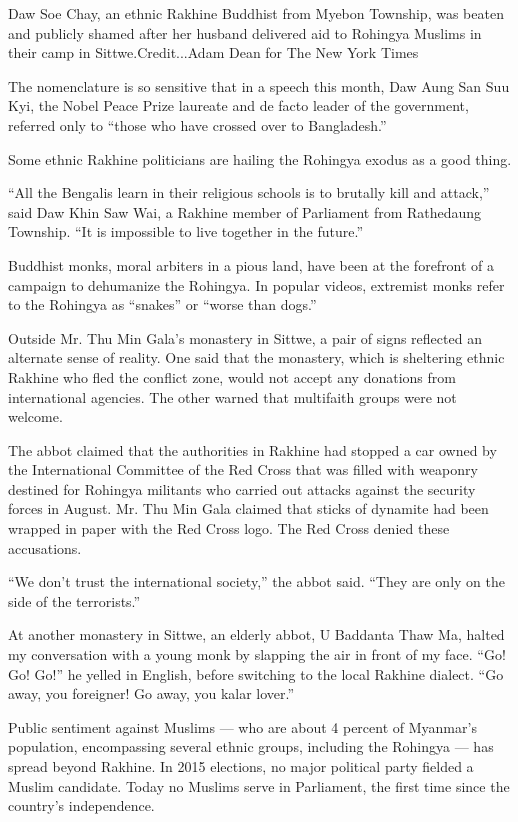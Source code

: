 Daw Soe Chay, an ethnic Rakhine Buddhist from Myebon Township, was
beaten and publicly shamed after her husband delivered aid to Rohingya
Muslims in their camp in Sittwe.Credit...Adam Dean for The New York
Times

The nomenclature is so sensitive that in a speech this month, Daw Aung
San Suu Kyi, the Nobel Peace Prize laureate and de facto leader of the
government, referred only to ``those who have crossed over to
Bangladesh.''

Some ethnic Rakhine politicians are hailing the Rohingya exodus as a
good thing.

``All the Bengalis learn in their religious schools is to brutally kill
and attack,'' said Daw Khin Saw Wai, a Rakhine member of Parliament from
Rathedaung Township. ``It is impossible to live together in the
future.''

Buddhist monks, moral arbiters in a pious land, have been at the
forefront of a campaign to dehumanize the Rohingya. In popular videos,
extremist monks refer to the Rohingya as ``snakes'' or ``worse than
dogs.''

Outside Mr. Thu Min Gala's monastery in Sittwe, a pair of signs
reflected an alternate sense of reality. One said that the monastery,
which is sheltering ethnic Rakhine who fled the conflict zone, would not
accept any donations from international agencies. The other warned that
multifaith groups were not welcome.

The abbot claimed that the authorities in Rakhine had stopped a car
owned by the International Committee of the Red Cross that was filled
with weaponry destined for Rohingya militants who carried out attacks
against the security forces in August. Mr. Thu Min Gala claimed that
sticks of dynamite had been wrapped in paper with the Red Cross logo.
The Red Cross denied these accusations.

``We don't trust the international society,'' the abbot said. ``They are
only on the side of the terrorists.''

At another monastery in Sittwe, an elderly abbot, U Baddanta Thaw Ma,
halted my conversation with a young monk by slapping the air in front of
my face. ``Go! Go! Go!'' he yelled in English, before switching to the
local Rakhine dialect. ``Go away, you foreigner! Go away, you kalar
lover.''

Public sentiment against Muslims --- who are about 4 percent of
Myanmar's population, encompassing several ethnic groups, including the
Rohingya --- has spread beyond Rakhine. In 2015 elections, no major
political party fielded a Muslim candidate. Today no Muslims serve in
Parliament, the first time since the country's independence.

